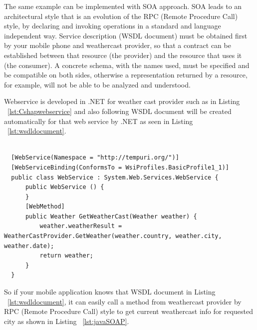 The same example can be implemented with SOA approach. SOA leads to an architectural style that is an evolution of the RPC (Remote Procedure Call) style, by declaring and invoking operations in a standard and language independent way. Service description (WSDL document) must be obtained first by your mobile phone and weathercast provider, so that a contract can be established between that resource (the provider) and the resource that uses it (the consumer). A concrete schema, with the names used, must be specified and be compatible on both sides, otherwise a representation returned by a resource, for example, will not be able to be analyzed and understood.

Webservice is developed in .NET for weather cast provider such as in Listing ~\ref{lst:Cshapwebservice} and also following WSDL document will be created automatically for that web service by .NET as seen in Listing ~\ref{lst:wsdldocument}.

\begin{lstlisting}[caption=SOAP Web Service with .Net, label=lst:Cshapwebservice]

  [WebService(Namespace = "http://tempuri.org/")]
  [WebServiceBinding(ConformsTo = WsiProfiles.BasicProfile1_1)]
  public class WebService : System.Web.Services.WebService {
      public WebService () {
      }
      [WebMethod]
      public Weather GetWeatherCast(Weather weather) {
          weather.weatherResult = WeatherCastProvider.GetWeather(weather.country, weather.city, weather.date);
          return weather;
      }
  }
\end{lstlisting}

So if your mobile application knows that WSDL document in Listing ~\ref{lst:wsdldocument}, it can easily call a method from weathercast provider by RPC (Remote Procedure Call) style to get current weathercast info for requested city as shown in Listing ~\ref{lst:javaSOAP}.

